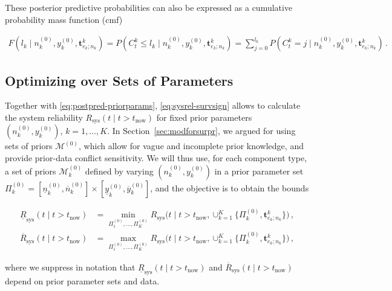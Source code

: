 \documentclass[Journal,letterpaper]{ascelike-new}
\renewcommand{\vec}[1]{{\bm#1}}
\newcommand{\uz}{^{(0)}} %
\newcommand{\ul}[1]{\underline{#1}}
\newcommand{\ol}[1]{\overline{#1}}
\newcommand{\Rsys}{R_\text{sys}}
\newcommand{\lRsys}{\ul{R}_\text{sys}}
\newcommand{\uRsys}{\ol{R}_\text{sys}}
\def\Rsys{R_\text{sys}}
\def\ykz{y\uz_k}
\def\ykzl{\ul{y}\uz_k}
\def\ykzu{\ol{y}\uz_k}
\def\nkz{n\uz_k}
\def\nkzl{\ul{n}\uz_k}
\def\nkzu{\ol{n}\uz_k}
\def\MZ{\mathcal{M}\uz}
\def\MkZ{\mathcal{M}\uz_k}
\def\PkZ{\Pi\uz_k}
\newcommand{\PZi}[1]{\Pi\uz_{#1}}
\def\tnow{t_\text{now}}
\begin{document}
%
These posterior predictive probabilities can also be expressed as a cumulative probability mass function (cmf) 
\begin{linenomath*}
\begin{align}
F(l_k \mid \nkz,\ykz,\vec{t}^k_{e_k;n_k}) = P(C^k_t \leq l_k \mid \nkz,\ykz,\vec{t}^k_{e_k;n_k}) 
 = \sum_{j=0}^{l_k} P(C^k_t = j \mid \nkz,\ykz,\vec{t}^k_{e_k;n_k})\,.
\end{align}
\end{linenomath*}


\subsection{Optimizing over Sets of Parameters}
\label{sec:optimize}

Together with \eqref{eq:postpred-priorparams},
\eqref{eq:sysrel-survsign} allows to calculate the system reliability $\Rsys(t\mid t>\tnow)$
for fixed prior parameters $(\nkz, \ykz)$, $k=1, \ldots, K$.
In Section~\ref{sec:modforsurpr}, we argued for using sets of priors $\MZ$,
which allow for vague and incomplete prior knowledge, and provide prior-data conflict sensitivity.
%
We will thus use, for each component type,
a set of priors $\MkZ$ defined by varying $(\nkz,\ykz)$ in a prior parameter set $\PkZ = [\nkzl,\nkzu] \times [\ykzl,\ykzu]$,
and the objective is to obtain the bounds
\begin{linenomath*}
\begin{align}
\lRsys(t \mid t > \tnow) &= \min_{\PZi{1},\ldots,\PZi{K}} \Rsys\big(t \mid t > \tnow, \cup_{k=1}^K \{\PkZ, \vec{t}^k_{e_k;n_k}\}\big)\,,
\label{eq:lrsysdef}\\
\uRsys(t \mid t > \tnow) &= \max_{\PZi{1},\ldots,\PZi{K}} \Rsys\big(t \mid t > \tnow, \cup_{k=1}^K \{\PkZ, \vec{t}^k_{e_k;n_k}\}\big)\,,
\label{eq:ursysdef}
\end{align}
\end{linenomath*}
where we suppress in notation that $\lRsys(t \mid t > \tnow)$ and $\uRsys(t \mid t > \tnow)$
depend on prior parameter sets and data.
\end{document}
